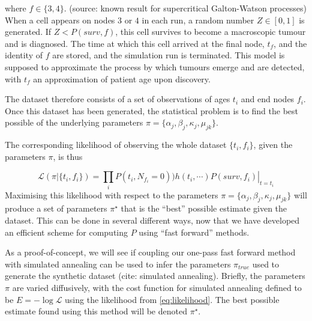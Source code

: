 \documentclass{article}
\begin{document}
where $f \in \{3,4\}$.
(source: known result for supercritical Galton-Watson processes)
When a cell appears on nodes $3$ or $4$ in each run, a random number $Z \in
[0,1]$ is generated. If $Z < P(surv,f)$, this cell survives to become a
macroscopic tumour and is diagnosed. The time at which this cell arrived at the
final node, $t_f$, and the identity of $f$ are stored, and the simulation run is
terminated. This model is supposed to approximate the process by which tumours emerge and are detected, with $t_f$ an approximation of patient age upon discovery.

The dataset therefore consists of a set of observations of ages $t_i$ and end
nodes $f_i$. Once this dataset has been generated, the statistical problem is to
find the best possible of the underlying
parameters $\pi = \{\alpha_j, \beta_j, \kappa_j, \mu_{jk}\}$.



The corresponding likelihood of observing the whole dataset $\{t_i,f_i\}$, given
the parameters $\pi$, is thus


\begin{equation}
    \mathcal{L}(\pi | \{t_i, f_i\}) = \prod_i 
    \left. P(t_i, N_{f_i} = 0)) h(t_i, \cdots) P(surv,f_i) \right|_{t=t_i}
    \label{eq:likelihood}
\end{equation}
Maximising this likelihood with respect to the parameters
$\pi = \{\alpha_j, \beta_j, \kappa_j, \mu_{jk}\}$ will produce a set of
parameters $\pi^\star$ that is the ``best'' possible estimate given the dataset.
This can be done in several different ways, now that we have developed an efficient scheme
for computing $P$ using ``fast forward'' methods. 

As a proof-of-concept, we will see if coupling our one-pass fast forward method
with simulated annealing can be used to infer the parameters $\pi_{true}$ used to
generate the synthetic dataset (cite: simulated annealing). Briefly, the parameters $\pi$ are varied
diffusively, with the cost function for simulated annealing defined to be $E =
-\log \mathcal{L}$ using the likelihood from \eqref{eq:likelihood}. The best
possible estimate found using this method will be denoted $\pi^\star$.
\end{document}
